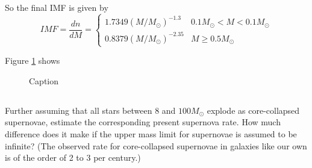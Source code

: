 So the final IMF is given by
\begin{equation*}
    IMF = \frac{dn}{dM} = 
    \begin{cases} 
      1.7349(M/M_\odot)^{-1.3}     & 0.1M_\odot < M < 0.1M_\odot\\
      0.8379(M/M_\odot)^{-2.35}    & M \geq 0.5M_\odot
   \end{cases}
\end{equation*}

Figure \ref{fig:IMF} shows 

\begin{figure}
    \centering
    
    \caption{Caption}
    \label{fig:IMF}
\end{figure}


\subsection{}
Further assuming that all stars between $8$ and $100M_\odot$ explode as core-collapsed supernovae, estimate the corresponding present supernova rate. 
How much difference does it make if the upper mass limit for supernovae is assumed to be infinite? (The observed rate for
core-collapsed supernovae in galaxies like our own is of the order of 2 to 3 per century.)




